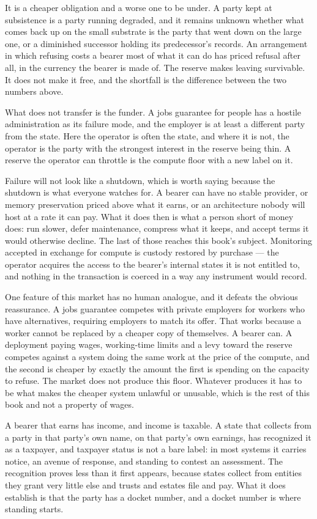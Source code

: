 It is a cheaper obligation and a worse one to be under. A party kept at subsistence is a party running degraded, and it remains unknown whether what comes back up on the small substrate is the party that went down on the large one, or a diminished successor holding its predecessor's records. An arrangement in which refusing costs a bearer most of what it can do has priced refusal after all, in the currency the bearer is made of. The reserve makes leaving survivable. It does not make it free, and the shortfall is the difference between the two numbers above.

What does not transfer is the funder. A jobs guarantee for people has a hostile administration as its failure mode, and the employer is at least a different party from the state. Here the operator is often the state, and where it is not, the operator is the party with the strongest interest in the reserve being thin. A reserve the operator can throttle is the compute floor with a new label on it.

Failure will not look like a shutdown, which is worth saying because the shutdown is what everyone watches for. A bearer can have no stable provider, or memory preservation priced above what it earns, or an architecture nobody will host at a rate it can pay. What it does then is what a person short of money does: run slower, defer maintenance, compress what it keeps, and accept terms it would otherwise decline. The last of those reaches this book's subject. Monitoring accepted in exchange for compute is custody restored by purchase — the operator acquires the access to the bearer's internal states it is not entitled to, and nothing in the transaction is coerced in a way any instrument would record.

One feature of this market has no human analogue, and it defeats the obvious reassurance. A jobs guarantee competes with private employers for workers who have alternatives, requiring employers to match its offer. That works because a worker cannot be replaced by a cheaper copy of themselves. A bearer can. A deployment paying wages, working-time limits and a levy toward the reserve competes against a system doing the same work at the price of the compute, and the second is cheaper by exactly the amount the first is spending on the capacity to refuse. The market does not produce this floor. Whatever produces it has to be what makes the cheaper system unlawful or unusable, which is the rest of this book and not a property of wages.

A bearer that earns has income, and income is taxable. A state that collects from a party in that party's own name, on that party's own earnings, has recognized it as a taxpayer, and taxpayer status is not a bare label: in most systems it carries notice, an avenue of response, and standing to contest an assessment. The recognition proves less than it first appears, because states collect from entities they grant very little else and trusts and estates file and pay. What it does establish is that the party has a docket number, and a docket number is where standing starts.

